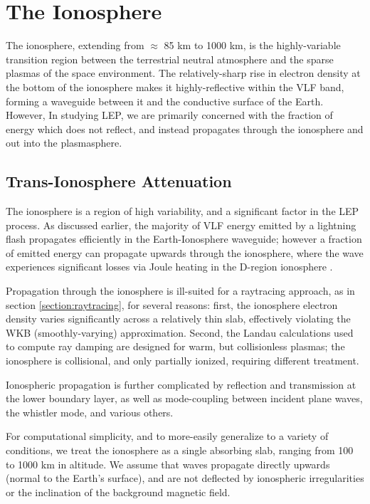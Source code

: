 \section{The Ionosphere}
The ionosphere, extending from $\approx$ 85 km to 1000 km, is the highly-variable transition region between the terrestrial neutral atmosphere and the sparse plasmas of the space environment. The relatively-sharp rise in electron density at the bottom of the ionosphere makes it highly-reflective within the VLF band, forming a waveguide between it and the conductive surface of the Earth. However, In studying LEP, we are primarily concerned with the fraction of energy which does not reflect, and instead propagates through the ionosphere and out into the plasmasphere.

\subsection{Trans-Ionosphere Attenuation}
\label{section:trans_ionosphere_atten}
The ionosphere is a region of high variability, and a significant factor in the LEP process. As discussed earlier, the majority of VLF energy emitted by a lightning flash propagates efficiently in the Earth-Ionosphere waveguide; however a fraction of emitted energy can propagate upwards through the ionosphere, where the wave experiences significant losses via Joule heating in the D-region ionosphere \citep{Graf2013, Blaes2016}.

Propagation through the ionosphere is ill-suited for a raytracing approach, as in section \ref{section:raytracing}, for several reasons: first, the ionosphere electron density varies significantly across a relatively thin slab, effectively violating the WKB (smoothly-varying) approximation. Second, the Landau calculations used to compute ray damping are designed for warm, but collisionless plasmas; the ionosphere is collisional, and only partially ionized, requiring different treatment.

Ionospheric propagation is further complicated by reflection and transmission at the lower boundary layer, as well as mode-coupling between incident plane waves, the whistler mode, and various others. 

For computational simplicity, and to more-easily generalize to a variety of conditions, we treat the ionosphere as a single absorbing slab, ranging from 100 to 1000 km in altitude. We assume that waves propagate directly upwards (normal to the Earth's surface), and are not deflected by ionospheric irregularities or the inclination of the background magnetic field.

